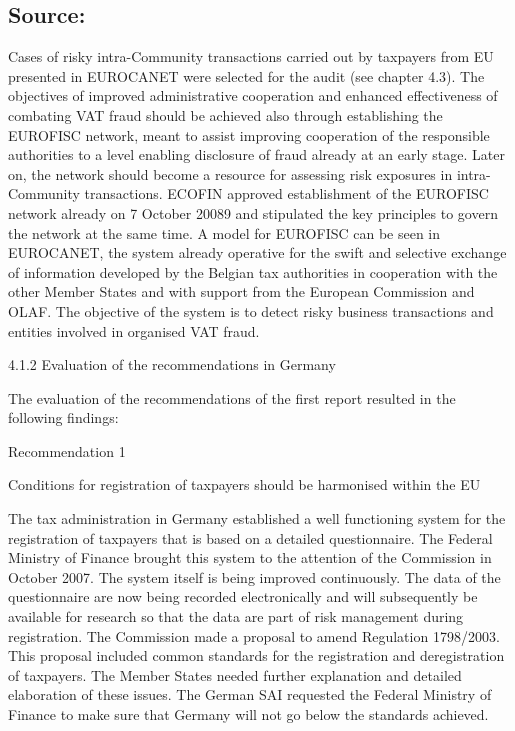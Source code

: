 \documentclass[10pt]{article}
\begin{document}
\subsection*{Source:}

Cases of risky intra-Community transactions carried out by taxpayers from EU presented in EUROCANET were selected for the audit (see chapter 4.3).
The objectives of improved administrative cooperation and enhanced effectiveness of combating VAT fraud should be achieved also through establishing the EUROFISC network, meant to assist improving cooperation of the responsible authorities to a level enabling disclosure of fraud already at an early stage.
Later on, the network should become a resource for assessing risk exposures in intra-Community transactions.
ECOFIN approved establishment of the EUROFISC network already on 7 October 20089 and stipulated the key principles to govern the network at the same time.
A model for EUROFISC can be seen in EUROCANET, the system already operative for the swift and selective exchange of information developed by the Belgian tax authorities in cooperation with the other Member States and with support from the European Commission and OLAF.
The objective of the system is to detect risky business transactions and entities involved in organised VAT fraud.


4.1.2 Evaluation of the recommendations in Germany



The evaluation of the recommendations of the first report resulted in the following findings:



Recommendation 1



Conditions for registration of taxpayers should be harmonised within the EU

The tax administration in Germany established a well functioning system for the registration of taxpayers that is based on a detailed questionnaire.
The Federal Ministry of Finance brought this system to the attention of the Commission in October 2007.
The system itself is being improved continuously.
The data of the questionnaire are now being recorded electronically and will subsequently be available for research so that the data are part of risk management during registration.
The Commission made a proposal to amend Regulation 1798/2003. This proposal included common standards for the registration and deregistration of taxpayers.
The Member States needed further explanation and detailed elaboration of these issues.
The German SAI requested the Federal Ministry of Finance to make sure that Germany will not go below the standards achieved.
\end{document}
